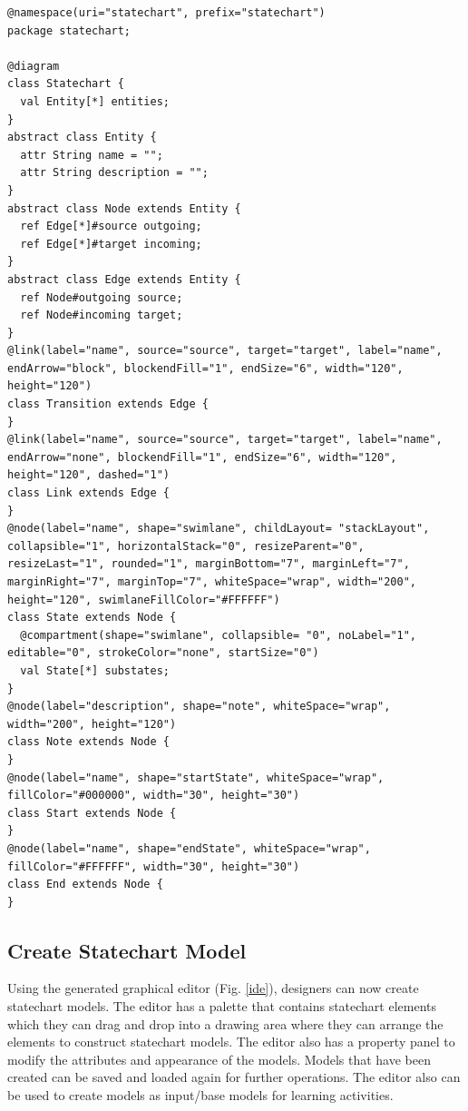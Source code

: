\documentclass[conference]{IEEEtran}
\begin{document}
\begin{lstlisting}[style=interfaces,caption={A definition of statechart diagram using Emfatic and Eugenia-like annotations.},label=metamodel]
@namespace(uri="statechart", prefix="statechart")
package statechart;

@diagram
class Statechart {
  val Entity[*] entities;
}
abstract class Entity {
  attr String name = "";
  attr String description = "";
}
abstract class Node extends Entity {
  ref Edge[*]#source outgoing;
  ref Edge[*]#target incoming;
}
abstract class Edge extends Entity {
  ref Node#outgoing source;
  ref Node#incoming target;
}
@link(label="name", source="source", target="target", label="name", endArrow="block", blockendFill="1", endSize="6", width="120", height="120")
class Transition extends Edge {
}
@link(label="name", source="source", target="target", label="name", endArrow="none", blockendFill="1", endSize="6", width="120", height="120", dashed="1")
class Link extends Edge {
}
@node(label="name", shape="swimlane", childLayout= "stackLayout", collapsible="1", horizontalStack="0", resizeParent="0", resizeLast="1", rounded="1", marginBottom="7", marginLeft="7", marginRight="7", marginTop="7", whiteSpace="wrap", width="200", height="120", swimlaneFillColor="#FFFFFF")
class State extends Node {
  @compartment(shape="swimlane", collapsible= "0", noLabel="1", editable="0", strokeColor="none", startSize="0")
  val State[*] substates;
}
@node(label="description", shape="note", whiteSpace="wrap", width="200", height="120")
class Note extends Node {
}
@node(label="name", shape="startState", whiteSpace="wrap", fillColor="#000000", width="30", height="30")
class Start extends Node {
}
@node(label="name", shape="endState", whiteSpace="wrap", fillColor="#FFFFFF", width="30", height="30")
class End extends Node {
}
\end{lstlisting} 

\subsection{Create Statechart Model}
Using the generated graphical editor (Fig. \ref{ide}), designers can now create statechart models. The editor has a palette that contains statechart elements which they can drag and drop into a drawing area where they can arrange the elements to construct statechart models. The editor also has a property panel to modify the attributes and appearance of the models. Models that have been created can be saved and loaded again for further operations. The editor also can be used to create models as input/base models for learning activities.        
\end{document}
